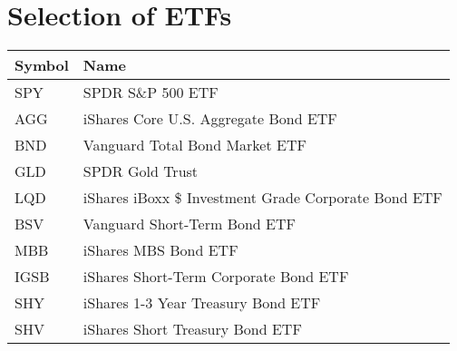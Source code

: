 \chapter{Selection of ETFs}
\label{appendix:etfs_corr}
\par
\begin{longtable}{|| m{2cm}| m{11.5cm}||}
\hline
Symbol & Name  \\ \hline \hline
SPY&SPDR S\&P 500 ETF \\ \hline
AGG&iShares Core U.S. Aggregate Bond ETF \\ \hline
BND&Vanguard Total Bond Market ETF \\ \hline
GLD&SPDR Gold Trust \\ \hline
LQD&iShares iBoxx \$ Investment Grade Corporate Bond ETF \\ \hline
BSV&Vanguard Short-Term Bond ETF \\ \hline
MBB&iShares MBS Bond ETF \\ \hline
IGSB&iShares Short-Term Corporate Bond ETF \\ \hline
SHY&iShares 1-3 Year Treasury Bond ETF \\ \hline
SHV&iShares Short Treasury Bond ETF \\ \hline



  
\end{longtable}